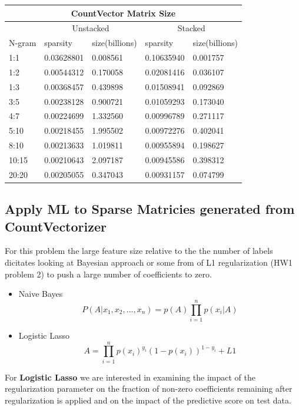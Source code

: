 \documentclass[11pt]{article}
\begin{document}
{\noindent \begin{tabular}{ |p{2cm}||p{2cm}|p{2cm}|p{2cm}|p{2cm}|  }
 \hline
 \multicolumn{5}{|c|}{CountVector Matrix Size} \\
 \hline
 \multicolumn{1}{|c|}{} &
 \multicolumn{2}{|c|}{Unstacked} &
 \multicolumn{2}{|c|}{Stacked}\\
 \hline
 N-gram & sparsity & size(billions) & sparsity & size(billions)\\
 \hline
       1:1& 0.03628801& 0.008561&  0.10635940&   0.001757 \\
       1:2& 0.00544312& 0.170058&  0.02081416&    0.036107\\
       1:3& 0.00368457& 0.439898&  0.01508941&     0.092869\\
       3:5& 0.00238128& 0.900721&  0.01059293&     0.173040\\
       4:7& 0.00224699& 1.332560&  0.00996789&     0.271117\\
      5:10& 0.00218455& 1.995502&  0.00972276&     0.402041\\
      8:10& 0.00213633& 1.019811&  0.00955894&     0.198627\\
     10:15& 0.00210643& 2.097187&  0.00945586&     0.398312\\
     20:20& 0.00205055& 0.347043&  0.00931157&     0.074799\\
 \hline
\end{tabular}

\subsection{Apply ML to Sparse Matricies generated from CountVectorizer}
\noindent
For this problem the large feature size relative to the the number of labels dicitates looking
at Bayesian approach or some from of L1 regularization (HW1 problem 2) to push a large number
of coefficients to zero.
\begin{itemize}
\item Naive Bayes
\begin{equation*}
P(A|x_1,x_2,...,x_n) = p(A)\prod_{i=1}^n p(x_i|A)
\end{equation*}

\item Logistic Lasso
\begin{equation*}
A = \prod_{i=1}^n p(x_i)^{y_i}(1-p(x_i))^{1-y_i}+ L1
\end{equation*}
\end{itemize}

\noindent 
For \textbf{Logistic Lasso} we are interested in examining the impact of the regularization parameter on
the fraction of  non-zero coefficients remaining after regularization is applied and on the impact of the predictive
score on test data. \\

}
\end{document}
